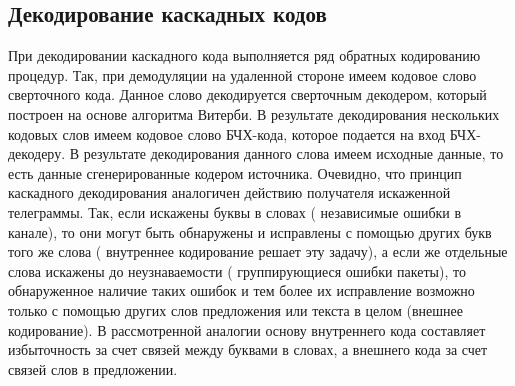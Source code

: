\subsection{Декодирование каскадных кодов}
При декодировании каскадного кода выполняется ряд обратных кодированию процедур. Так, при демодуляции на 
удаленной стороне имеем кодовое слово сверточного кода. Данное слово декодируется сверточным декодером, 
который построен на основе алгоритма Витерби. В результате декодирования нескольких кодовых слов имеем 
кодовое слово БЧХ-кода, которое подается на вход БЧХ-декодеру. В результате декодирования данного слова 
имеем исходные данные, то есть данные сгенерированные кодером источника.  Очевидно, что принцип каскадного 
декодирования аналогичен действию получателя искаженной телеграммы. Так, если искажены буквы в словах (
независимые ошибки в канале), то они могут быть обнаружены и исправлены с помощью других букв того же слова (
внутреннее кодирование решает эту задачу), а если же отдельные слова искажены до неузнаваемости ( 
группирующиеся ошибки пакеты), то обнаруженное наличие таких ошибок и тем более их исправление возможно 
только с помощью других слов предложения или текста в целом (внешнее кодирование). В рассмотренной аналогии 
основу внутреннего кода составляет избыточность за счет связей между буквами в словах, а внешнего кода за 
счет связей слов в предложении.
